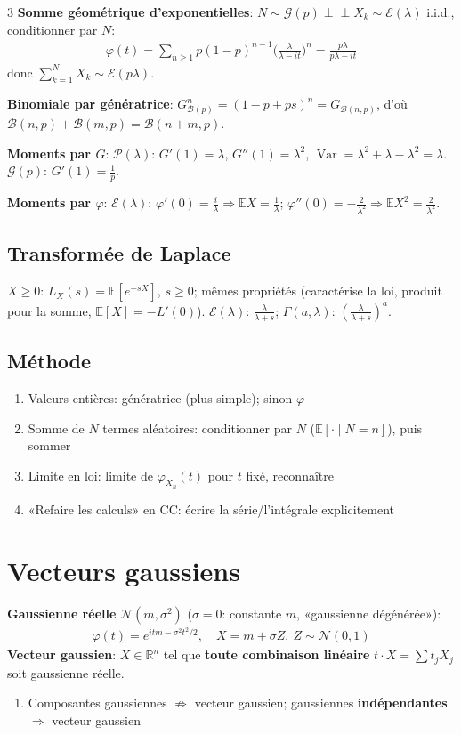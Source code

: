 \documentclass[12pt, a4paper]{article}
\newcommand{\E}{\mathbb{E}}
\newcommand{\R}{\mathbb{R}}
\newcommand{\Var}{\operatorname{Var}}
\begin{document}
\begin{multicols*}{3}
	\textbf{Somme géométrique d'exponentielles}: $N\sim\mathcal G(p)\perp\!\!\!\perp X_k\sim\mathcal E(\lambda)$ i.i.d., conditionner par $N$:
	\begin{gather*}
		\varphi(t)=\sum_{n\geq1}p(1-p)^{n-1}\Big(\frac\lambda{\lambda-it}\Big)^n=\frac{p\lambda}{p\lambda-it}
	\end{gather*}
	donc $\sum_{k=1}^NX_k\sim\mathcal E(p\lambda)$.

	\textbf{Binomiale par génératrice}: $G_{\mathcal B(p)}^n=(1-p+ps)^n=G_{\mathcal B(n,p)}$, d'où $\mathcal B(n,p)+\mathcal B(m,p)=\mathcal B(n+m,p)$.

	\textbf{Moments par $G$}: $\mathcal P(\lambda)$: $G'(1)=\lambda$, $G''(1)=\lambda^2$, $\Var=\lambda^2+\lambda-\lambda^2=\lambda$. $\mathcal G(p)$: $G'(1)=\frac1p$.

	\textbf{Moments par $\varphi$}: $\mathcal E(\lambda)$: $\varphi'(0)=\frac{i}{\lambda}\Rightarrow\E X=\frac1\lambda$; $\varphi''(0)=-\frac2{\lambda^2}\Rightarrow\E X^2=\frac2{\lambda^2}$.

	\subsection{Transformée de Laplace}
	$X\geq0$: $L_X(s)=\E[e^{-sX}]$, $s\geq0$; mêmes propriétés (caractérise la loi, produit pour la somme, $\E[X]=-L'(0)$). $\mathcal E(\lambda)$: $\frac\lambda{\lambda+s}$; $\Gamma(a,\lambda)$: $(\frac\lambda{\lambda+s})^a$.

	\subsection{Méthode}
	\begin{enumerate}[\roman*.]
		\item Valeurs entières: génératrice (plus simple); sinon $\varphi$
		\item Somme de $N$ termes aléatoires: conditionner par $N$ ($\E[\cdot\mid N=n]$), puis sommer
		\item Limite en loi: limite de $\varphi_{X_n}(t)$ pour $t$ fixé, reconnaître
		\item «Refaire les calculs» en CC: écrire la série/l'intégrale explicitement
	\end{enumerate}

	\colbreak
	\section{Vecteurs gaussiens}
	\textbf{Gaussienne réelle} $\mathcal N(m,\sigma^2)$ ($\sigma=0$: constante $m$, «gaussienne dégénérée»):
	\begin{gather*}
		\varphi(t)=e^{itm-\sigma^2t^2/2},\quad X=m+\sigma Z,\ Z\sim\mathcal N(0,1)
	\end{gather*}
	\textbf{Vecteur gaussien}: $X\in\R^n$ tel que \textbf{toute combinaison linéaire} $t\cdot X=\sum t_jX_j$ soit gaussienne réelle.
	\begin{enumerate}[\roman*.]
		\item Composantes gaussiennes $\not\Rightarrow$ vecteur gaussien; gaussiennes \textbf{indépendantes} $\Rightarrow$ vecteur gaussien
	\end{enumerate}


\end{multicols*}
\end{document}

